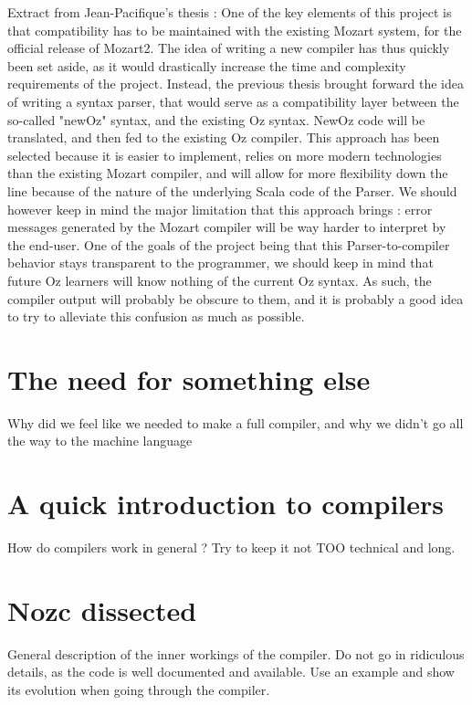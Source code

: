 
Extract from Jean-Pacifique's thesis :
One of the key elements of this project is that compatibility has to be maintained with the existing Mozart system, for the official release of Mozart2.
The idea of writing a new compiler has thus quickly been set aside, as it would drastically increase the time and complexity requirements of the project.
Instead, the previous thesis brought forward the idea of writing a syntax parser, that would serve as a compatibility layer between the so-called "newOz" syntax, and the existing Oz syntax.\cite{jpthesis}
NewOz code will be translated, and then fed to the existing Oz compiler.\newline
This approach has been selected because it is easier to implement, relies on more modern technologies than the existing Mozart compiler, and will allow for more flexibility down the line because of the nature of the underlying Scala code of the Parser.
We should however keep in mind the major limitation that this approach brings : error messages generated by the Mozart compiler will be way harder to interpret by the end-user.
One of the goals of the project being that this Parser-to-compiler behavior stays transparent to the programmer, we should keep in mind that future Oz learners will know nothing of the current Oz syntax.
As such, the compiler output will probably be obscure to them, and it is probably a good idea to try to alleviate this confusion as much as possible.\newline

\section{The need for something else}\label{sec:ch2WhyCompiler}
Why did we feel like we needed to make a full compiler, and why we didn't go all the way to the machine language

\section{A quick introduction to compilers}\label{sec:ch2WhatIsCompiler}
How do compilers work in general ?
Try to keep it not TOO technical and long.

\section{Nozc dissected}\label{sec:ch2HowCompiler}
General description of the inner workings of the compiler.
Do not go in ridiculous details, as the code is well documented and available.
Use an example and show its evolution when going through the compiler.

